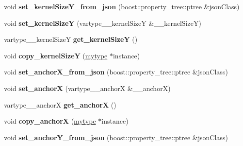 \begin{DoxyCompactItemize}
void {\bfseries set\+\_\+kernel\+Size\+Y\+\_\+from\+\_\+json} (boost\+::property\+\_\+tree\+::ptree \&json\+Class)
\item 
\mbox{\label{classfilter_1_1algos_1_1_dilate_aa8664f36d3f5f1ed9d89f5860ec6b01d}} 
void {\bfseries set\+\_\+kernel\+SizeY} (vartype\+\_\+\+\_\+kernel\+SizeY \&\+\_\+\+\_\+kernel\+SizeY)
\item 
\mbox{\label{classfilter_1_1algos_1_1_dilate_a6534c28d28630ac3e701b4d55735bb73}} 
vartype\+\_\+\+\_\+kernel\+SizeY {\bfseries get\+\_\+kernel\+SizeY} ()
\item 
\mbox{\label{classfilter_1_1algos_1_1_dilate_a6e17d2ebc1bf6abb4bc166b201fb3b7a}} 
void {\bfseries copy\+\_\+kernel\+SizeY} (\hyperlink{classfilter_1_1algos_1_1_dilate}{mytype} $\ast$instance)
\item 
\mbox{\label{classfilter_1_1algos_1_1_dilate_aa0c40a0e409d206154f4fe9250579fc0}} 
void {\bfseries set\+\_\+anchor\+X\+\_\+from\+\_\+json} (boost\+::property\+\_\+tree\+::ptree \&json\+Class)
\item 
\mbox{\label{classfilter_1_1algos_1_1_dilate_aa36b71d9387b6a1166047caa6d507b76}} 
void {\bfseries set\+\_\+anchorX} (vartype\+\_\+\+\_\+anchorX \&\+\_\+\+\_\+anchorX)
\item 
\mbox{\label{classfilter_1_1algos_1_1_dilate_a5750b340c8d34d3b8c951d578f52bdc9}} 
vartype\+\_\+\+\_\+anchorX {\bfseries get\+\_\+anchorX} ()
\item 
\mbox{\label{classfilter_1_1algos_1_1_dilate_ad68b6e29e30614c9131c019157db50b8}} 
void {\bfseries copy\+\_\+anchorX} (\hyperlink{classfilter_1_1algos_1_1_dilate}{mytype} $\ast$instance)
\item 
\mbox{\label{classfilter_1_1algos_1_1_dilate_ae9e267ebb6d66de1cd7f38e512cbab3e}} 
void {\bfseries set\+\_\+anchor\+Y\+\_\+from\+\_\+json} (boost\+::property\+\_\+tree\+::ptree \&json\+Class)
\item 
\mbox{\label{classfilter_1_1algos_1_1_dilate_a556a9d1d1127e3c6dd6b3e1adb8d939a}} 

\end{DoxyCompactItemize}
